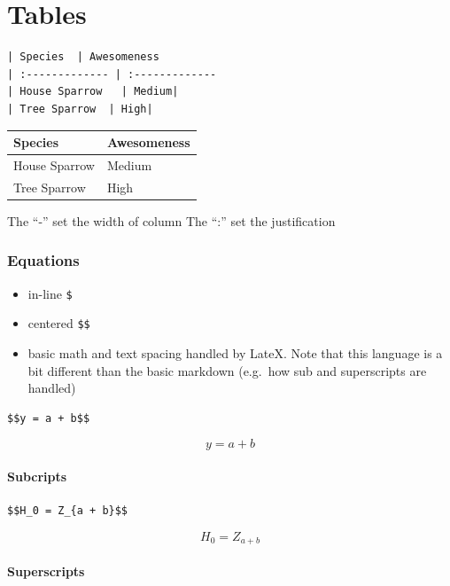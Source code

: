 \documentclass[
]{article}
\begin{document}
\hypertarget{tables}{%
\section{Tables}\label{tables}}

\begin{verbatim}
| Species  | Awesomeness
| :------------- | :-------------
| House Sparrow   | Medium|
| Tree Sparrow  | High|
\end{verbatim}

\begin{longtable}[]{@{}ll@{}}
\toprule
Species & Awesomeness\tabularnewline
\midrule
\endhead
House Sparrow & Medium\tabularnewline
Tree Sparrow & High\tabularnewline
\bottomrule
\end{longtable}

The ``-'' set the width of column The ``:'' set the justification

\hypertarget{equations}{%
\subsubsection{Equations}\label{equations}}

\begin{itemize}
\item
  in-line \texttt{\$}
\item
  centered \texttt{\$\$}
\item
  basic math and text spacing handled by LateX. Note that this language
  is a bit different than the basic markdown (e.g.~how sub and
  superscripts are handled)
\end{itemize}

\begin{verbatim}
$$y = a + b$$
\end{verbatim}

\[y = a + b\]

\hypertarget{subcripts}{%
\paragraph{Subcripts}\label{subcripts}}

\begin{verbatim}
$$H_0 = Z_{a + b}$$
\end{verbatim}

\[H_0 = Z_{a + b}\]

\hypertarget{superscripts}{%
\paragraph{Superscripts}\label{superscripts}}
\end{document}
